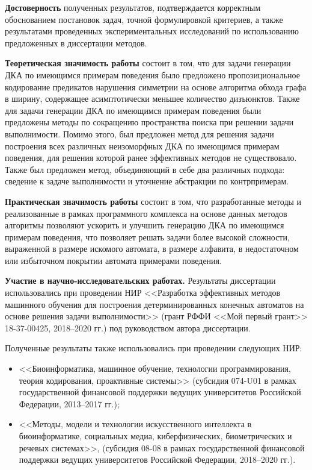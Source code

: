 \textbf{Достоверность} полученных результатов, подтверждается корректным обоснованием постановок задач, точной формулировкой критериев, а также результатами проведенных экспериментальных исследований по использованию предложенных в диссертации методов.

\textbf{Теоретическая значимость работы} состоит в том, что для задачи генерации ДКА по имеющимся примерам поведения было предложено пропозициональное кодирование предикатов нарушения симметрии на основе алгоритма обхода графа в ширину, содержащее асимптотически меньшее количество дизъюнктов.
Также для задачи генерации ДКА по имеющимся примерам поведения были предложены методы по сокращению пространства поиска при решении задачи выполнимости.
Помимо этого, был предложен метод для решения задачи построения всех различных неизоморфных ДКА по имеющимся примерам поведения, для решения которой ранее эффективных методов не существовало.
Также был предложен метод, объединяющий в себе два различных подхода: сведение к задаче выполнимости и уточнение абстракции по контрпримерам.

\textbf{Практическая значимость работы} состоит в том, что разработанные методы и реализованные в рамках программного комплекса на основе данных методов алгоритмы  позволяют ускорить и улучшить генерацию ДКА по имеющимся примерам поведения, что позволяет решать задачи более высокой сложности, выраженной в размере искомого автомата, в размере алфавита, в недостаточном или избыточном покрытии автомата примерами поведения.

\textbf{Участие в научно-исследовательских работах.} 
Результаты диссертации использовались при проведении НИР <<Разработка эффективных методов машинного обучения для построения детерминированных конечных автоматов на основе решения задачи выполнимости>> (грант РФФИ <<Мой первый грант>> 18-37-00425, 2018--2020 гг.) под руководством автора диссертации.

Полученные результаты также использовались при проведении следующих НИР:
\begin{itemize}
  \item <<Биоинформатика, машинное обучение, технологии программирования, теория кодирования, проактивные системы>> (субсидия \mbox{074-U01} в рамках государственной финансовой поддержки ведущих университетов Российской Федерации, 2013--2017 гг.);
  \item <<Методы, модели и технологии искусственного интеллекта в биоинформатике, социальных медиа, киберфизических, биометрических и речевых системах>>, (субсидия \mbox{08-08} в рамках государственной финансовой поддержки ведущих университетов Российской Федерации, 2018--2020 гг.).
\end{itemize}

